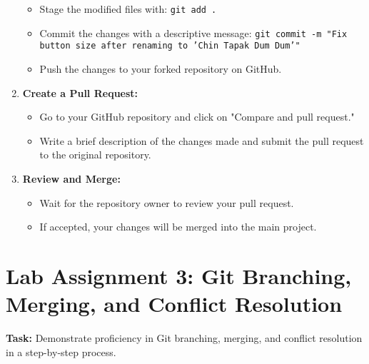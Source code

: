 \documentclass[a4paper,12pt]{report}
\begin{document}
\begin{enumerate}[label=\arabic*.]
    \begin{itemize}
        \item Stage the modified files with: \texttt{git add .}
        \item Commit the changes with a descriptive message: \texttt{git commit -m "Fix button size after renaming to 'Chin Tapak Dum Dum'"}
        \item Push the changes to your forked repository on GitHub.
    \end{itemize}
    \item \textbf{Create a Pull Request:}
    \begin{itemize}
        \item Go to your GitHub repository and click on "Compare and pull request."
        \item Write a brief description of the changes made and submit the pull request to the original repository.
    \end{itemize}
    \item \textbf{Review and Merge:}
    \begin{itemize}
        \item Wait for the repository owner to review your pull request.
        \item If accepted, your changes will be merged into the main project.
    \end{itemize}
\end{enumerate}
\section{Lab Assignment 3: Git Branching, Merging, and Conflict Resolution}

\textbf{Task:} Demonstrate proficiency in Git branching, merging, and conflict resolution in a step-by-step process.
\end{document}

